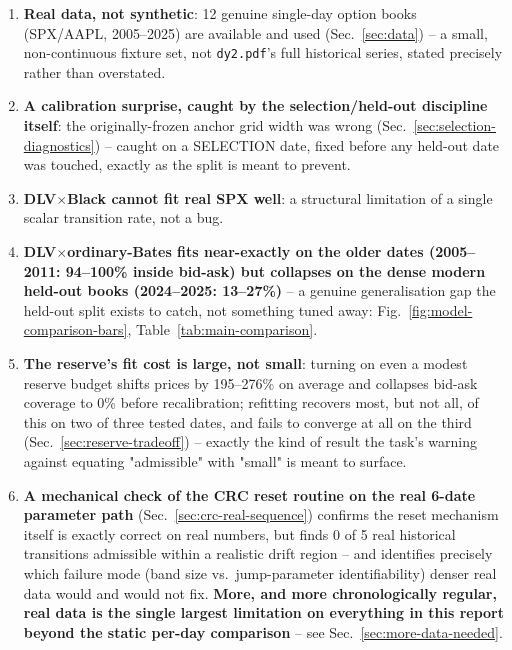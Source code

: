 \documentclass[11pt]{article}
\begin{document}
\begin{enumerate}
\item \textbf{Real data, not synthetic}: 12 genuine single-day option
  books (SPX/AAPL, 2005--2025) are available and used
  (Sec.~\ref{sec:data}) -- a small, non-continuous fixture set, not
  \texttt{dy2.pdf}'s full historical series, stated precisely rather than
  overstated.
\item \textbf{A calibration surprise, caught by the selection/held-out
  discipline itself}: the originally-frozen anchor grid width was wrong
  (Sec.~\ref{sec:selection-diagnostics}) -- caught on a SELECTION date, fixed
  before any held-out date was touched, exactly as the split is meant to
  prevent.
\item \textbf{DLV$\times$Black cannot fit real SPX well}: a structural
  limitation of a single scalar transition rate, not a bug.
\item \textbf{DLV$\times$ordinary-Bates fits near-exactly on the older
  dates (2005--2011: 94--100\% inside bid-ask) but collapses on the dense
  modern held-out books (2024--2025: 13--27\%)} -- a genuine
  generalisation gap the held-out split exists to catch, not something
  tuned away: Fig.~\ref{fig:model-comparison-bars},
  Table~\ref{tab:main-comparison}.
\item \textbf{The reserve's fit cost is large, not small}: turning on even
  a modest reserve budget shifts prices by 195--276\% on average and
  collapses bid-ask coverage to 0\% before recalibration; refitting
  recovers most, but not all, of this on two of three tested dates, and
  fails to converge at all on the third (Sec.~\ref{sec:reserve-tradeoff}) --
  exactly the kind of result the task's warning against equating
  "admissible" with "small" is meant to surface.
\item \textbf{A mechanical check of the CRC reset routine on the real
  6-date parameter path} (Sec.~\ref{sec:crc-real-sequence}) confirms the
  reset mechanism itself is exactly correct on real numbers, but finds
  0 of 5 real historical transitions admissible within a realistic
  drift region -- and identifies precisely which failure mode (band size
  vs.\ jump-parameter identifiability) denser real data would and would
  not fix. \textbf{More, and more chronologically regular, real data is
  the single largest limitation on everything in this report beyond the
  static per-day comparison} -- see Sec.~\ref{sec:more-data-needed}.
\end{enumerate}







\end{document}
